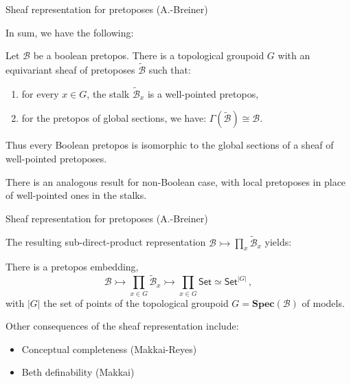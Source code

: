 \documentclass{beamer}
\newcommand{\B}{\ensuremath{\mathcal{B}}}
\newcommand{\Set}{\mathsf{Set}}
\begin{document}
\begin{frame}{Sheaf representation for pretoposes (A.-Breiner)}

In sum, we have the following:

\begin{theorem}[A.-Breiner 2013]
Let $\B$ be a boolean pretopos.  
There is a topological groupoid $G$ with an equivariant sheaf of pretoposes $\tilde{\B}$ such that:
\begin{enumerate}
\item for every $x\in G$, the stalk $\tilde{\B}_x$ is a well-pointed pretopos, 
\item for the pretopos of global sections, we have: $\Gamma(\tilde{\B}) \cong \B$.
\end{enumerate}
Thus every Boolean pretopos is isomorphic to the global sections of a sheaf of well-pointed pretoposes.  
\end{theorem}
\medskip

There is an analogous result for non-Boolean case, with local pretoposes in place of well-pointed ones in the stalks.

\end{frame}
\begin{frame}{Sheaf representation for pretoposes (A.-Breiner)}

The resulting sub-direct-product representation $\mathcal{B}\rightarrowtail \prod_{x}\tilde{\mathcal{B}}_x$ yields:\\[1ex]

\begin{corollary} 
There is a pretopos embedding,
\[
\mathcal{B}\rightarrowtail \prod_{x\in G}\tilde{\mathcal{B}}_{x} \rightarrowtail \prod_{x\in G}\Set \simeq \Set^{|G|}\,,
\]
with $|G|$ the set of points of the topological groupoid $G = \mathbf{Spec}(\mathcal{B})$ of models.
\end{corollary}
\medskip

Other consequences of the sheaf representation include:

\begin{itemize}
\item Conceptual completeness (Makkai-Reyes)
\item Beth definability (Makkai)
\end{itemize}


\end{frame}
\end{document}
